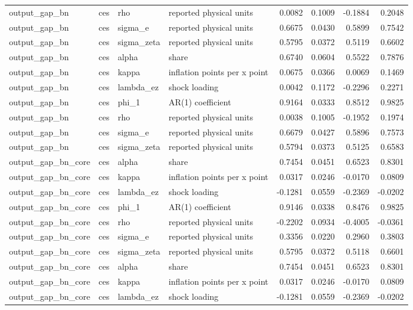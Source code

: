 \begin{tabular}{llllrrrr}
output\_gap\_bn & ces & rho & reported physical units & 0.0082 & 0.1009 & -0.1884 & 0.2048 \\
output\_gap\_bn & ces & sigma\_e & reported physical units & 0.6675 & 0.0430 & 0.5899 & 0.7542 \\
output\_gap\_bn & ces & sigma\_zeta & reported physical units & 0.5795 & 0.0372 & 0.5119 & 0.6602 \\
output\_gap\_bn & ces & alpha & share & 0.6740 & 0.0604 & 0.5522 & 0.7876 \\
output\_gap\_bn & ces & kappa & inflation points per x point & 0.0675 & 0.0366 & 0.0069 & 0.1469 \\
output\_gap\_bn & ces & lambda\_ez & shock loading & 0.0042 & 0.1172 & -0.2296 & 0.2271 \\
output\_gap\_bn & ces & phi\_1 & AR(1) coefficient & 0.9164 & 0.0333 & 0.8512 & 0.9825 \\
output\_gap\_bn & ces & rho & reported physical units & 0.0038 & 0.1005 & -0.1952 & 0.1974 \\
output\_gap\_bn & ces & sigma\_e & reported physical units & 0.6679 & 0.0427 & 0.5896 & 0.7573 \\
output\_gap\_bn & ces & sigma\_zeta & reported physical units & 0.5794 & 0.0373 & 0.5125 & 0.6583 \\
output\_gap\_bn\_core & ces & alpha & share & 0.7454 & 0.0451 & 0.6523 & 0.8301 \\
output\_gap\_bn\_core & ces & kappa & inflation points per x point & 0.0317 & 0.0246 & -0.0170 & 0.0809 \\
output\_gap\_bn\_core & ces & lambda\_ez & shock loading & -0.1281 & 0.0559 & -0.2369 & -0.0202 \\
output\_gap\_bn\_core & ces & phi\_1 & AR(1) coefficient & 0.9146 & 0.0338 & 0.8476 & 0.9825 \\
output\_gap\_bn\_core & ces & rho & reported physical units & -0.2202 & 0.0934 & -0.4005 & -0.0361 \\
output\_gap\_bn\_core & ces & sigma\_e & reported physical units & 0.3356 & 0.0220 & 0.2960 & 0.3803 \\
output\_gap\_bn\_core & ces & sigma\_zeta & reported physical units & 0.5795 & 0.0372 & 0.5118 & 0.6601 \\
output\_gap\_bn\_core & ces & alpha & share & 0.7454 & 0.0451 & 0.6523 & 0.8301 \\
output\_gap\_bn\_core & ces & kappa & inflation points per x point & 0.0317 & 0.0246 & -0.0170 & 0.0809 \\
output\_gap\_bn\_core & ces & lambda\_ez & shock loading & -0.1281 & 0.0559 & -0.2369 & -0.0202 \\

\end{tabular}
